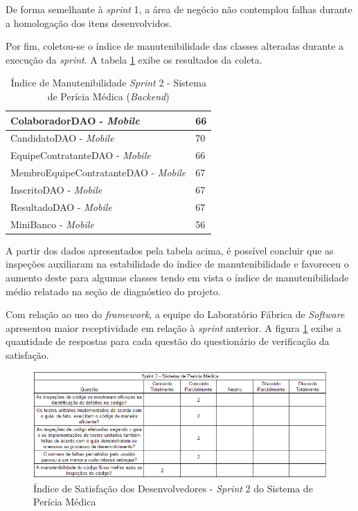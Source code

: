 De forma semelhante à \textit{sprint} 1, a área de negócio não contemplou falhas durante a homologação dos itens desenvolvidos.

Por fim, coletou-se o índice de manutenibilidade das classes alteradas durante a execução da \textit{sprint}. A tabela \ref{table:tabela17} exibe os resultados da coleta.

\begin{table}[h]
\caption{Índice de Manutenibilidade \textit{Sprint} 2 - Sistema de Perícia Médica (\textit{Backend})}
\centering
\begin{tabular}{ | m{12cm} | m{4cm} | } 
\hline
ColaboradorDAO - \textit{Mobile} & 66 \\ 
\hline
CandidatoDAO - \textit{Mobile} & 70 \\
\hline
EquipeContratanteDAO - \textit{Mobile} & 66 \\
\hline
MembroEquipeContratanteDAO - \textit{Mobile} & 67 \\
\hline
InscritoDAO - \textit{Mobile} & 67 \\
\hline
ResultadoDAO - \textit{Mobile} & 67 \\
\hline
MiniBanco - \textit{Mobile} & 56 \\
\hline
\end{tabular}
\label{table:tabela17}
\end{table}

\clearpage

A partir dos dados apresentados pela tabela acima, é possível concluir que as inspeções auxiliaram na estabilidade do índice de manutenibilidade e favoreceu o aumento deste para algumas classes tendo em vista o índice de manutenibilidade médio relatado na seção de diagnóstico do projeto.

Com relação ao uso do \textit{framework}, a equipe do Laboratório Fábrica de \textit{Software} apresentou maior receptividade em relação à \textit{sprint} anterior. A figura \ref{fig:satisfacaoPericia2} exibe a quantidade de respostas para cada questão do questionário de verificação da satisfação.

\begin{figure}[h]
\includegraphics[width=\textwidth]{figuras/isd_pericia_2.png}
\caption{Índice de Satisfação dos Desenvolvedores - \textit{Sprint} 2 do Sistema de Perícia Médica}
\label{fig:satisfacaoPericia2}
\end{figure}

